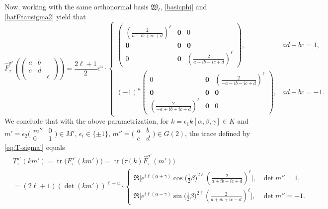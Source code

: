 \documentclass[11pt,oneside]{amsart}
\numberwithin{equation}{section}
\theoremstyle{remark}
\theoremstyle{plain}
\DeclareMathOperator{\tr}{tr}
\begin{document}
Now, working with the same orthonormal basis $\mathfrak{W}_{\ell}$, \eqref{basicphi} and \eqref{hatFtausigma2} yield that
\[\hat F_\tau^{\sigma'}\left(\begin{pmatrix}a&b&\\c&d&\\&&\epsilon\end{pmatrix}\right)=\frac{2\ell+1}{2}\epsilon^u\cdot
\begin{cases}
\begin{pmatrix} \left(\frac{2}{a-ib+ic+d}\right)^{\ell} & \mathbf{0} & 0 \\ \mathbf{0} & \mathbf{0} & \mathbf{0} \\ 0 & \mathbf{0} & \left(\frac{2}{a+ib-ic+d}\right)^{\ell} \end{pmatrix}, & ad-bc=1,\\ 
(-1)^{u}\begin{pmatrix} 0 & \mathbf{0} & \left(\frac{2}{-a-ib-ic+d}\right)^{\ell} \\ \mathbf{0} & \mathbf{0} & \mathbf{0} \\ \left(\frac{2}{-a+ib+ic+d}\right)^{\ell} & \mathbf{0} & 0 \end{pmatrix}, & ad-bc=-1.
\end{cases}\]
We conclude that with the above parametrization, for $k=\epsilon_1k[\alpha,\beta,\gamma]\in K$ and $m'=\epsilon_2\big(\begin{smallmatrix}m''&0\\0&1\end{smallmatrix}\big)\in M'$, $\epsilon_i\in\{\pm 1\}$, $m''=\big(\begin{smallmatrix}a&b\\c&d\end{smallmatrix}\big)\in G(2)$, the trace defined by \eqref{eq:T-sigma'} equals
\begin{equation}
\label{n-3-tr-explicit}
\begin{aligned}
&T_\tau^{\sigma'}(km')=\tr\big(F_{\tau}^{\sigma'}(km')\big)=\tr\bigl(\tau(k)\hat F_\tau^{\sigma'}(m')\bigr)\\
& = (2\ell + 1)(\det(km'))^{\ell+u}\cdot \begin{cases}\Re\Big[ e^{i\ell(\alpha + \gamma)} \cos\big(\frac{1}{2} \beta\big)^{2\ell}\left( \frac{2}{a+ib-ic+d}\right)^{\ell}\Big], &\det m'' = 1,\\[6pt]
\Re\Big[ e^{i\ell(\alpha-\gamma)} \sin\big(\frac{1}{2} \beta\big)^{2\ell}\left( \frac{2}{a+ib+ic-d}\right)^{\ell}\Big], &\det m''= -1.\end{cases}
\end{aligned}
\end{equation}
\end{document}
